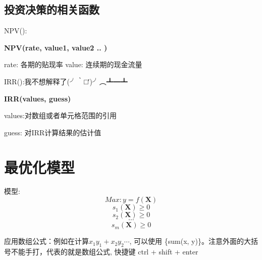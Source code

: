 \documentclass[10pt, a4paper]{article}
\begin{document}
\subsection{投资决策的相关函数}
NPV():
\begin{center}
    \textbf{NPV(rate, value1, value2 .. )}

    rate: 各期的贴现率
    value: 连续期的现金流量
\end{center}

IRR():我不想解释了(╯‵□′)╯︵┻━┻ 
\begin{center}
    \textbf{IRR(values, guess)}
    
    values:对数组或者单元格范围的引用

    guess: 对IRR计算结果的估计值

\end{center}
 
\section{最优化模型}
    模型:
    $$Max: y = f(\textbf{X})$$
   $$s_1(\textbf{X}) \geqslant 0$$ 
        $$s_2(\textbf{X}) \geqslant 0$$
            $$\cdots$$
        $$s_m(\textbf{X}) \geqslant 0$$

    应用数组公式：例如在计算$x_1y_1 + x_2y_2 \cdots$, 可以使用 \{sum(x, y)\}。注意外面的大括号不能手打，代表的就是数组公式, 快捷键 ctrl + shift + enter
\end{document}
